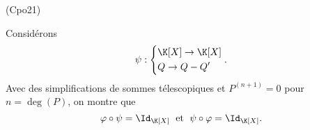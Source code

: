 \begin{tiny}(Cpo21)\end{tiny} Considérons
\[
 \psi :
\left\lbrace 
\begin{aligned}
 &\K[X] \rightarrow \K[X]\\
 &Q \rightarrow Q - Q'
\end{aligned}
\right..
\]
Avec des simplifications de sommes télescopiques et $P^{(n+1)} = 0$ pour $n= \deg(P)$, on montre que
\[
  \varphi \circ \psi = \Id_{\K[X]} \;\text{ et } \; \psi \circ \varphi  = \Id_{\K[X]}.
\]
